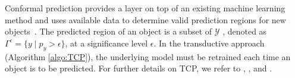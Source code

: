 \documentclass[main]{subfiles}
\begin{document}
%
%



 
Conformal prediction provides a layer on top of an existing machine learning method and uses available data to determine valid prediction regions for new objects~\citep{vovk2005algorithmic}. 
The predicted region of an object is a subset of $\mathcal{Y}$ , denoted as $\Gamma^{\epsilon} = \{ y \mid p_y > \epsilon \}$, at a significance level $\epsilon$. In the transductive approach (Algorithm \ref{algo:TCP}), the underlying model must be retrained each time an object is to be predicted. For further details on TCP, we refer to \cite{vapnik1998statistical}, \cite{shafer2008tutorial}, \cite{vovk2005algorithmic} and \cite{balasubramanian2014conformal}. 
\end{document}
